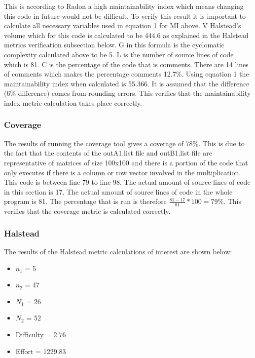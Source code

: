 \documentclass[10.5pt,journal, a4paper]{IEEEtran}
\begin{document}
\noindent
This is according to Radon a high maintainability index which means changing this code in future would not be difficult. To verify this result it is important to calculate all necessary variables used in equation 1 for MI above. V Halstead's volume which for this code is calculated to be 444.6 as explained in the Halstead metrics verification subsection below. G in this formula is the cyclomatic complexity calculated above to be 5. L is the number of source lines of code which is 81. C is the percentage of the code that is comments. There are 14 lines of comments which makes the percentage comments 12.7\%. Using equation 1 the maintainability index when calculated is 55.366. It is assumed that the difference (6\% difference) comes from rounding errors. This verifies that the maintainability index metric calculation takes place correctly. 




\subsubsection{Coverage}
\noindent
The results of running the coverage tool gives a coverage of 78\%. This is due to the fact that the contents of the outA1.list file and outB1.list file are representative of matrices of size 100x100 and there is a portion of the code that only executes if there is a column or row vector involved in the multiplication. This code is between line 79 to line 98. The actual amount of source lines of code in this section is 17. The actual amount of source lines of code in the whole program is 81. The percentage that is run is therefore $\frac{81-17}{81}*100 = 79\% $. This verifies that the coverage metric is calculated correctly. 



\subsubsection{Halstead}
\noindent
The results of the Halstead metric calculations of interest are shown below:
\begin{itemize}
\item $n_{1}$ = 5
\item $n_{2}$ = 47
\item $N_{1}$ = 26
\item $N_{2}$ = 52
\item Difficulty = 2.76
\item Effort = 1229.83
\end{itemize}
\end{document}
